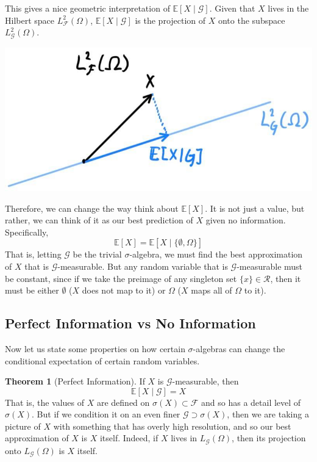 \documentclass{article}
\theoremstyle{definition}
\newtheorem{theorem}{Theorem}[section]
\theoremstyle{remark}
\theoremstyle{definition}
\begin{document}
This gives a nice geometric interpretation of $\mathbb{E}[X \mid \mathcal{G}]$. Given that $X$ lives in the Hilbert space $L^2_\mathcal{F} (\Omega)$, $\mathbb{E}[X \mid \mathcal{G}]$ is the projection of $X$ onto the subspace $L^2_\mathcal{G} (\Omega)$. 
\begin{center}
    \includegraphics[scale=0.3]{img/Hilbert_Space_projection.jpg}
\end{center}
Therefore, we can change the way think about $\mathbb{E}[X]$. It is not just a value, but rather, we can think of it as our best prediction of $X$ given no information. Specifically, 
\[\mathbb{E}[X] = \mathbb{E}[X \mid \{\emptyset, \Omega\}]\]
That is, letting $\mathcal{G}$ be the trivial $\sigma$-algebra, we must find the best approximation of $X$ that is $\mathcal{G}$-measurable. But any random variable that is $\mathcal{G}$-measurable must be constant, since if we take the preimage of any singleton set $\{x\} \in \mathcal{R}$, then it must be either $\emptyset$ ($X$ does not map to it) or $\Omega$ ($X$ maps all of $\Omega$ to it).

\subsection{Perfect Information vs No Information}

Now let us state some properties on how certain $\sigma$-algebras can change the conditional expectation of certain random variables. 

\begin{theorem}[Perfect Information]
If $X$ is $\mathcal{G}$-measurable, then 
\[\mathbb{E}[X \mid \mathcal{G}] = X\]
That is, the values of $X$ are defined on $\sigma(X) \subset \mathcal{F}$ and so has a detail level of $\sigma(X)$. But if we condition it on an even finer $\mathcal{G} \supset \sigma(X)$, then we are taking a picture of $X$ with something that has overly high resolution, and so our best approximation of $X$ is $X$ itself. Indeed, if $X$ lives in $L_\mathcal{G} (\Omega)$, then its projection onto $L_\mathcal{G} (\Omega)$ is $X$ itself. 
\end{theorem}
\end{document}

